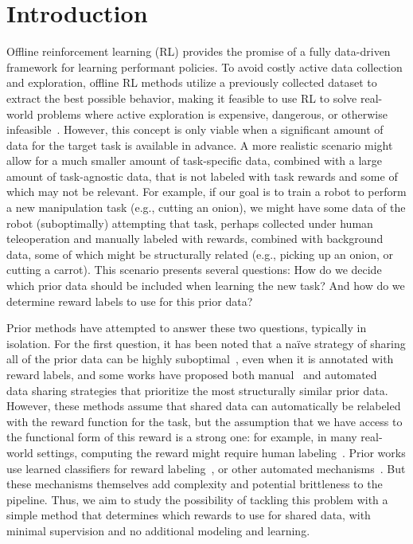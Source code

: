 \documentclass[nohyperref]{article}
\theoremstyle{plain}
\theoremstyle{definition}
\theoremstyle{remark}
\begin{document}
\vspace{-0.15cm}
\section{Introduction}
\vspace{-0.1cm}
Offline reinforcement learning (RL) provides the promise of a fully data-driven framework for learning performant policies. To avoid costly active data collection and exploration, offline RL methods utilize a previously collected dataset to extract the best possible behavior, making it feasible to use RL to solve real-world problems where active exploration is expensive, dangerous, or otherwise infeasible~\citep{zhan2021deepthermal, de2021discovering, Wang2018SupervisedRL, kalashnikov2018scalable}. 
However, this concept is only viable when a significant amount of data for the target task is available in advance. A more realistic scenario might allow for a much smaller amount of task-specific data, combined with a large amount of task-agnostic data, that is not labeled with task rewards and some of which may not be relevant. For example, if our goal is to train a robot to perform a new manipulation task (e.g., cutting an onion), we might have some data of the robot (suboptimally) attempting that task, perhaps collected under human teleoperation and manually labeled with rewards, combined with background data, some of which might be structurally related (e.g., picking up an onion, or cutting a carrot). {This scenario presents several questions: How do we decide which prior data should be included when learning the new task? And how do we determine reward labels to use for this prior data?}

Prior methods have attempted to answer these two questions, typically in isolation. For the first question, it has been noted that a na\"{i}ve strategy of sharing all of the prior data can be highly suboptimal~\citep{kalashnikov2021mt}, even when it is annotated with reward labels, and some works have proposed both manual~\citep{kalashnikov2021mt} and automated~\citep{yu2021conservative,eysenbach2020rewriting} data sharing strategies that prioritize the most structurally similar prior data. 
However, these methods assume that shared data can automatically be relabeled with the reward function for the task,
but the assumption that we have access to the functional form of this reward is a strong one: for example, in many real-world settings, computing the reward might require human labeling~\citep{cabi2019scaling,finn2016deep}. 
Prior works use learned classifiers for reward labeling~\citep{VICEFu2018,xie2018few,singh2019end}, or other automated mechanisms~\citep{konyushkova2020semi}. But these mechanisms themselves add complexity and potential brittleness to the pipeline. Thus, we aim to study the possibility of tackling this problem with a simple method that determines which rewards to use for shared data, with minimal supervision and no additional modeling and learning.
\end{document}
